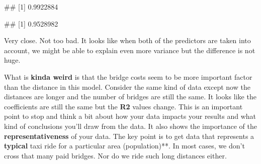 \documentclass[
]{book}
\newenvironment{Shaded}{\begin{snugshade}}{\end{snugshade}}
\newcommand{\CommentTok}[1]{\textcolor[rgb]{0.56,0.35,0.01}{\textit{#1}}}
\newcommand{\FunctionTok}[1]{\textcolor[rgb]{0.00,0.00,0.00}{#1}}
\newcommand{\NormalTok}[1]{#1}
\newcommand{\OtherTok}[1]{\textcolor[rgb]{0.56,0.35,0.01}{#1}}
\newcommand{\SpecialCharTok}[1]{\textcolor[rgb]{0.00,0.00,0.00}{#1}}
\begin{document}
\begin{Shaded}
\end{Shaded}

\begin{Shaded}
\begin{Highlighting}[]
\NormalTok{\#\# [1] 0.9922884}
\end{Highlighting}
\end{Shaded}

\begin{Shaded}
\end{Shaded}

\begin{Shaded}
\begin{Highlighting}[]
\NormalTok{\#\# [1] 0.9528982}
\end{Highlighting}
\end{Shaded}

Very close. Not too bad. It looks like when both of the predictors are taken into account, we might be able to explain even more variance but the difference is not huge.

What is \textbf{kinda weird} is that the bridge costs seem to be more important factor than the distance in this model. Consider the same kind of data except now the distances are longer and the number of bridges are still the same. It looks like the coefficients are still the same but the \textbf{R2} values change. This is an important point to stop and think a bit about how your data impacts your results and what kind of conclusions you'll draw from the data. It also shows the importance of the \textbf{representativeness} of your data. The key point is to get data that represents a \textbf{typical} taxi ride for a particular area (population)**. In most cases, we don't cross that many paid bridges. Nor do we ride such long distances either.

\begin{Shaded}
\end{Shaded}
\end{document}
